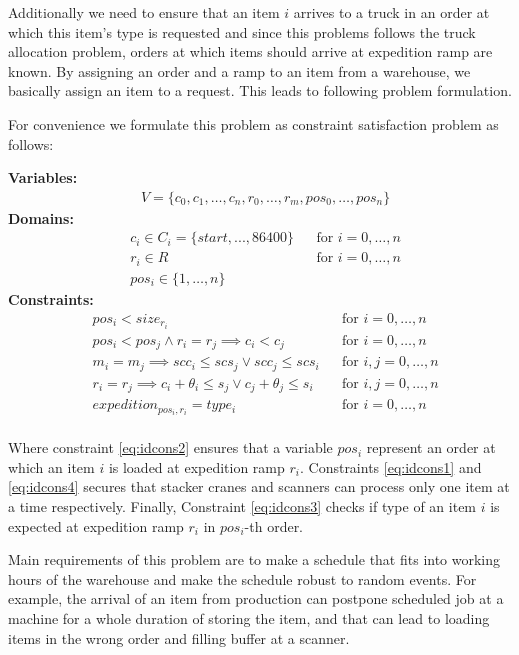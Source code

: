 \documentclass{ctuthesis}
\begin{document}
Additionally we need to ensure that an item $i$ arrives to a truck in an order at which this item's type is requested and since this problems follows the truck allocation problem, orders at which items should arrive at expedition ramp are known. By assigning an order and a ramp to an item from a warehouse, we basically assign an item to a request. This leads to following problem formulation.

For convenience we formulate this problem as constraint satisfaction problem as follows:

\textbf{Variables:}
\begin{align}
    &V = \{c_{0}, c_{1}, \ldots, c_{n},r_0, \ldots, r_m, pos_0, \ldots, pos_n\}
\end{align}
\textbf{Domains:}
\begin{align}
&c_{i} \in C_i = \{start, ..., 86400\} && \text{for } i=0,\ldots,n\\
&r_{i} \in R && \text{for } i=0,\ldots,n\\
&pos_i \in \{1, \ldots, n\}
\end{align}
\textbf{Constraints:}
 \begin{align}
& pos_i < size_{r_i} && \text{for } i=0,\ldots,n \nonumber \\
& pos_i < pos_j \land r_i = r_j \implies c_i < c_j && \text{for } i=0,\ldots,n\\ \label{eq:idcons2}
& m_i = m_j \implies scc_i \leq scs_j \lor scc_j \leq scs_i && \text{for } i,j=0,\ldots,n\\ \label{eq:idcons1}
& r_i = r_j \implies c_i  + \theta_i \leq s_j \lor c_j + \theta_j \leq s_i && \text{for } i,j=0,\ldots,n\\ \label{eq:idcons4}
& expedition_{pos_i,r_i} = type_i  && \text{for } i=0,\ldots,n\\ \label{eq:idcons3}
\end{align}

Where constraint \ref{eq:idcons2} ensures that a variable $pos_i$ represent an order at which an item $i$ is loaded at expedition ramp $r_i$. Constraints \ref{eq:idcons1} and \ref{eq:idcons4} secures that stacker cranes and scanners can process only one item at a time respectively. Finally, Constraint \ref{eq:idcons3} checks if type of an item $i$ is expected at expedition ramp $r_i$ in $pos_i$-th order.

Main requirements of this problem are to make a schedule that fits into working hours of the warehouse and make the schedule robust to random events. For example, the arrival of an item from production can postpone scheduled job at a machine for a whole duration of storing the item, and that can lead to loading items in the wrong order and filling buffer at a scanner. 
\end{document}
